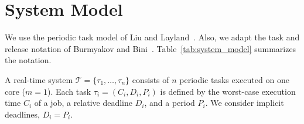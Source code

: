 \documentclass[conference]{IEEEtran}
\begin{document}
%
%










\section{System Model}
\label{sec:system_model}

We use the periodic task model of Liu and Layland~\cite{LiuLayland1973}. Also, we adapt the task and release notation of Burmyakov and Bini~\cite{BurmyakovBini2026}. Table~\ref{tab:system_model} summarizes the notation.

A real-time system $\mathcal{T}=\{\tau_1,\ldots,\tau_n\}$ consists of $n$ periodic tasks executed on one core ($m=1$). Each task $\tau_i=(C_i,D_i,P_i)$ is defined by the worst-case execution time $C_i$ of a job, a relative deadline $D_i$, and a period $P_i$. We consider implicit deadlines, $D_i=P_i$.
\end{document}
